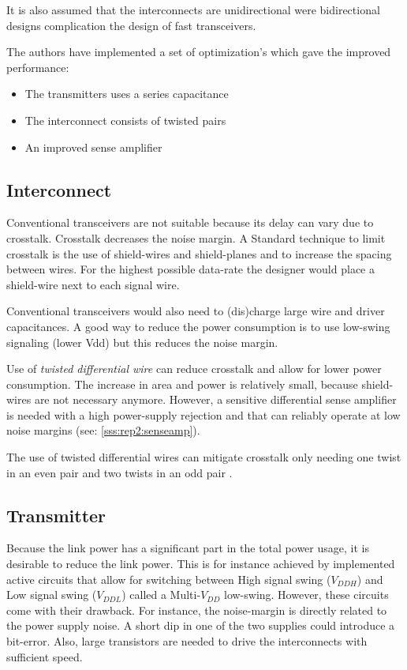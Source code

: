 It is also assumed that the interconnects are unidirectional were bidirectional designs complication the design of fast transceivers.

The authors have implemented a set of optimization's which gave the improved performance:
\begin{itemize}
    \item The transmitters uses a series capacitance
    \item The interconnect consists of twisted pairs
    \item An improved sense amplifier
\end{itemize}

\subsection{Interconnect} \label{sss:rep2:interconnect}
Conventional transceivers are not suitable because its delay can vary due to crosstalk.
Crosstalk decreases the noise margin.
A Standard technique to limit crosstalk is the use of shield-wires and shield-planes and to increase the spacing between wires.
For the highest possible data-rate the designer would place a shield-wire next to each signal wire.

Conventional transceivers would also need to (dis)charge large wire and driver capacitances.
A good way to reduce the power consumption is to use low-swing signaling (lower Vdd) but this reduces the noise margin.

Use of \textit{twisted differential wire} can reduce crosstalk and allow for lower power consumption. 
The increase in area and power is relatively small, because shield-wires are not necessary anymore.
However, a sensitive differential sense amplifier is needed with a high power-supply rejection and that can reliably operate at low noise margins (see: \cref{sss:rep2:senseamp}).

The use of twisted differential wires can mitigate crosstalk only needing one twist in an even pair and two twists in an odd pair \cite{mensink2007optimal}.


\subsection{Transmitter}
Because the link power has a significant part in the total power usage, it is desirable to reduce the link power. 
This is for instance achieved by implemented active circuits that allow for switching between High signal swing ($V_{DDH}$) and Low signal swing ($V_{DDL}$) called a Multi-$V_{DD}$ low-swing. 
However, these circuits come with their drawback. 
For instance, the noise-margin is directly related to the power supply noise. 
A short dip in one of the two supplies could introduce a bit-error.
Also, large transistors are needed to drive the interconnects with sufficient speed.

